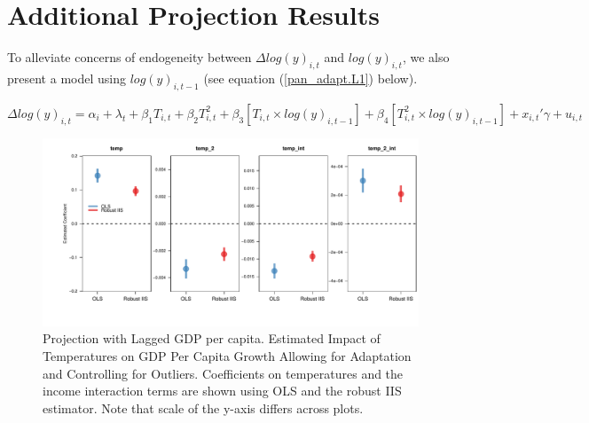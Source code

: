 \documentclass[11pt, letterpaper]{article}
\numberwithin{algorithm}{section}
\numberwithin{assumption}{section}
\numberwithin{lemma}{section}
\numberwithin{theorem}{section}
\numberwithin{corollary}{section}
\numberwithin{remark}{section}
\numberwithin{equation}{section}
\numberwithin{figure}{section}
\numberwithin{table}{section}
\begin{document}
%


\clearpage
\section{Additional Projection Results} \label{sec_add_proj}

To alleviate concerns of endogeneity between $\Delta log(y)_{i,t}$ and $log(y)_{i, t}$, we also present a model using $log(y)_{i, t-1}$ (see equation (\ref{pan_adapt.L1}) below).

\begin{small}
\begin{equation}
\label{pan_adapt.L1}
\Delta log(y)_{i,t} = \alpha_i + \lambda_t + \beta_1 T_{i,t} + \beta_2 T^2_{i,t} + \beta_3 \left[ T_{i,t} \times  log(y)_{i, t-1} \right] + \beta_4 \left[  T^2_{i,t} \times  log(y)_{i, t-1} \right] + x_{i,t}'\gamma + u_{i,t}
\end{equation}
\end{small}



\begin{figure}[!htbp]  %
\centering
\includegraphics[width = \textwidth]{coef.adapt.L1.pdf}
\caption{Projection with Lagged GDP per capita. Estimated Impact of Temperatures on GDP Per Capita Growth Allowing for Adaptation and Controlling for Outliers. Coefficients on temperatures and the income interaction terms are shown using OLS and the robust IIS estimator. Note that scale of the y-axis differs across plots.}
\label{fig_dist_coef_app1_appendix}
\end{figure}
\end{document}
